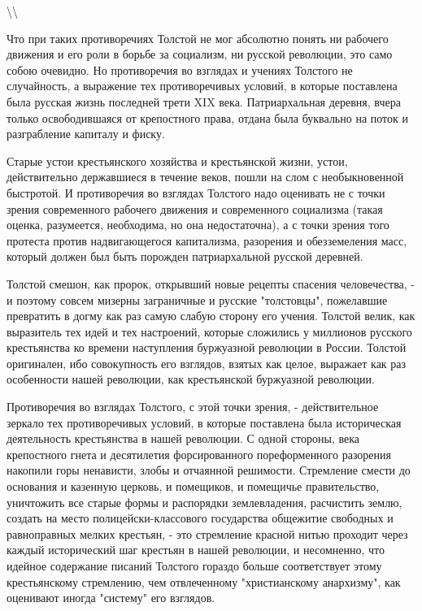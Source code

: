 \documentclass[12pt]{article}
\newcommand\ellipsis{%
  \textbackslash\thinspace\textellipsis\textbackslash
}
\newcommand{\parnum}{(\arabic{parcount})}
\newcounter{parcount}
\newenvironment{parnumbers}{%
  \par%
  \everypar{\noindent \stepcounter{parcount}\marginpar[]{\parnum}}%
}{}
\begin{document}
\ellipsis

\begin{parnumbers}
Что при таких противоречиях Толстой не мог абсолютно понять ни рабочего движения и его роли в борьбе за социализм, ни русской революции, это само собою очевидно. Но противоречия во взглядах и учениях Толстого не случайность, а выражение тех противоречивых условий, в которые поставлена была русская жизнь последней трети XIX века. Патриархальная деревня, вчера только освободившаяся от крепостного права, отдана была буквально на поток и разграбление капиталу и фиску.

Старые устои крестьянского хозяйства и крестьянской жизни, устои, действительно державшиеся в течение веков, пошли на слом с необыкновенной быстротой. И противоречия во взглядах Толстого надо оценивать не с точки зрения современного рабочего движения и современного социализма (такая оценка, разумеется, необходима, но она недостаточна), а с точки зрения того протеста против надвигающегося капитализма, разорения и обезземеления масс, который должен был быть порожден патриархальной русской деревней.

Толстой смешон, как пророк, открывший новые рецепты спасения человечества, - и поэтому совсем мизерны заграничные и русские "толстовцы", пожелавшие превратить в догму как раз самую слабую сторону его учения. Толстой велик, как выразитель тех идей и тех настроений, которые сложились у миллионов русского крестьянства ко времени наступления буржуазной революции в России. Толстой оригинален, ибо совокупность его взглядов, взятых как целое, выражает как раз особенности нашей революции, как крестьянской буржуазной революции.

Противоречия во взглядах Толстого, с этой точки зрения, - действительное зеркало тех противоречивых условий, в которые поставлена была историческая деятельность крестьянства в нашей революции. С одной стороны, века крепостного гнета и десятилетия форсированного пореформенного разорения накопили горы ненависти, злобы и отчаянной решимости. Стремление смести до основания и казенную церковь, и помещиков, и помещичье правительство, уничтожить все старые формы и распорядки землевладения, расчистить землю, создать на место полицейски-классового государства общежитие свободных и равноправных мелких крестьян, - это стремление красной нитью проходит через каждый исторический шаг крестьян в нашей революции, и несомненно, что идейное содержание писаний Толстого гораздо больше соответствует этому крестьянскому стремлению, чем отвлеченному "христианскому анархизму", как оценивают иногда "систему" его взглядов.


\end{parnumbers}
\end{document}
